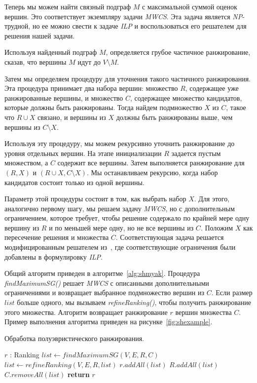 Теперь мы можем найти связный подграф $M$ с максимальной суммой оценок вершин.
Это соответствует экземпляру задачи \emph{MWCS}. Эта задача является
\emph{NP}-трудной, но ее можно свести к задаче \emph{ILP} и воспользоваться его
решателем для решения нашей задачи.

Используя найденный подграф $M$, определяется грубое частичное ранжирование,
сказав, что вершины $M$ идут до $V \setminus M$.

Затем мы определяем процедуру для уточнения такого частичного ранжирования.
Эта процедура принимает два набора вершин: множество $R$, содержащее уже
ранжированные вершины, и множество $C$, содержащее множество кандидатов,
которые должны быть ранжированы. Тогда найдем подмножество $X$ из $C$, такое
что $R \cup X$ связано, и вершины из $X$ должны быть ранжированы выше, чем
вершины из $C \setminus X$.

Используя эту процедуру, мы можем рекурсивно уточнить ранжирование до уровня
отдельных вершин. На этапе инициализации $R$ задается пустым множеством, а $C$
содержит все вершины.  Затем выполняется ранжирование для $(R, X)$ и $(R \cup
X, C \setminus X)$.  Мы останавливаем рекурсию, когда набор кандидатов состоит
только из одной вершины.

Параметр этой процедуры состоит в том, как выбрать набор $X$.  Для этого,
аналогично первому шагу, мы решаем задачу \emph{MWCS}, но с дополнительным
ограничением, которое требует, чтобы решение содержало по крайней мере одну
вершину из $R$ и по меньшей мере одну, но не все вершины из $C$. Положим $X$
как пересечение решения и множества $C$.  Соответствующая задача решается
модифицированным решателем из~\cite{Loboda2016}, где соответствующие
ограничения были добавлены в формулировку \emph{ILP}.

Общий алгоритм приведен в алгоритме~\ref{alg:shmyak}.  Процедура
\emph{findMaximumSG()} решает \emph{MWCS} с описанными дополнительными
ограничениями и возвращает выбранное подмножество вершин из $C$.  Если размер
$list$ больше одного, мы вызываем \emph{refineRanking()}, чтобы получить
ранжирование этого множества. Алгоритм возвращает ранжирование $r$ вершин
множества $C$.  Пример выполнения алгоритма приведен на
рисунке~\ref{fig:shexample}.

\begin{algorithm}[h!]
    \caption{Обработка полуэвристического ранжирования.}\label{alg:shmyak}
    \begin{algorithmic}[1]
        \State $r$ : Ranking
            \State $list \gets  findMaximumSG(V, E, R, C)$
                \State $list \gets refineRanking(V, E, R, list)$
            \EndIf
            \State $r.addAll(list)$
            \State $R.addAll(list)$
            \State $C.removeAll(list)$
        \EndWhile
        \State \textbf{return} $r$
        \EndProcedure
    \end{algorithmic}
\end{algorithm}

